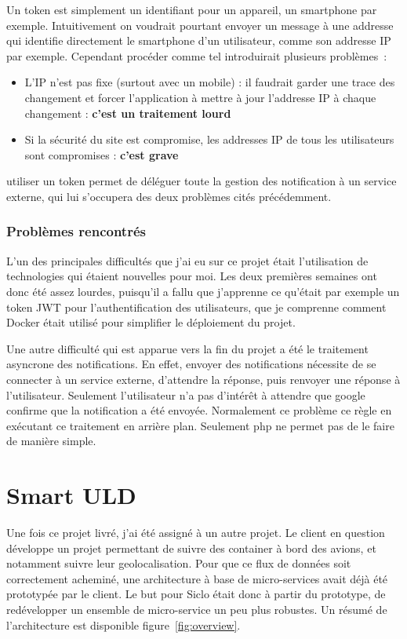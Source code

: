 \documentclass[../rapport.tex]{subfiles}
\begin{document}
        Un token est simplement un identifiant pour un appareil, un smartphone
        par exemple. Intuitivement on voudrait pourtant envoyer un message à
        une addresse qui identifie directement le smartphone d'un utilisateur,
        comme son addresse IP par exemple. Cependant procéder comme tel
        introduirait plusieurs problèmes~:
    \begin{itemize}
        \item L'IP n'est pas fixe (surtout avec un mobile) : il faudrait garder
            une trace des changement et forcer l'application à mettre à jour l'addresse IP à chaque
            changement : \textbf{c'est un traitement lourd}
        \item Si la sécurité du site est compromise, les addresses IP de tous
            les utilisateurs sont compromises : \textbf{c'est grave}
    \end{itemize}
        utiliser un token permet de déléguer toute la gestion des notification à un service externe, qui lui s'occupera des deux problèmes
        cités précédemment.


        \subsubsection{Problèmes rencontrés}
        L'un des principales difficultés que j'ai eu sur ce projet était l'utilisation de technologies qui étaient nouvelles pour moi.
        Les deux premières semaines ont donc été assez lourdes, puisqu'il a fallu que j'apprenne ce qu'était par exemple un token JWT pour l'authentification des utilisateurs, que je comprenne comment Docker était utilisé pour simplifier le déploiement du projet.

        Une autre difficulté qui est apparue vers la fin du projet a été le traitement asyncrone des notifications. En effet, envoyer des notifications nécessite de se connecter à un service externe, d'attendre la réponse, puis renvoyer une réponse à l'utilisateur. Seulement l'utilisateur n'a pas d'intérêt à attendre que google confirme que la notification a été envoyée. Normalement ce problème ce règle en exécutant ce traitement en arrière plan. Seulement php ne permet pas de le faire de manière simple.

        \section{Smart ULD}
        Une fois ce projet livré, j'ai été assigné à un autre projet.
        Le client en question développe un projet permettant de suivre des container
        à bord des avions, et notamment suivre leur geolocalisation.
        Pour que ce flux de données soit correctement acheminé, une architecture à base de micro-services
        avait déjà été prototypée par le client. Le but pour Siclo était donc à
        partir du prototype, de 
        redévelopper un ensemble de micro-service un peu plus robustes. Un
        résumé de l'architecture est disponible figure~\ref{fig:overview}.
\end{document}
